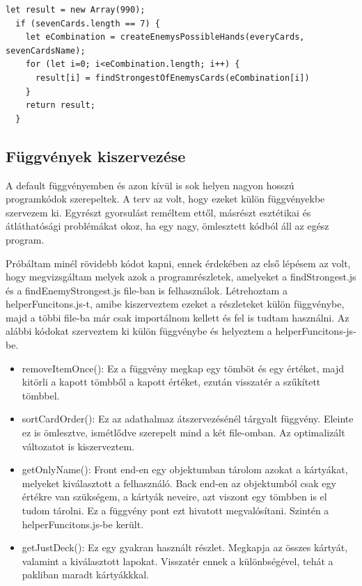 \begin{lstlisting}[style=htmlcssjs]
  let result = new Array(990);
  if (sevenCards.length == 7) {
    let eCombination = createEnemysPossibleHands(everyCards, sevenCardsName);
    for (let i=0; i<eCombination.length; i++) {
      result[i] = findStrongestOfEnemysCards(eCombination[i])
    }
    return result;
  }
\end{lstlisting}

\subsection{Függvények kiszervezése}
A default függvényemben és azon kívül is sok helyen nagyon hosszú programkódok szerepeltek. A terv az volt, hogy ezeket külön függvényekbe szervezem ki. Egyrészt gyorsulást reméltem ettől, másrészt esztétikai és átláthatósági problémákat okoz, ha egy nagy, ömlesztett kódból áll az egész program.

Próbáltam minél rövidebb kódot kapni, ennek érdekében az első lépésem az volt, hogy megvizsgáltam melyek azok a programrészletek, amelyeket a findStrongest.js és a findEnemyStrongest.js file-ban is felhasználok. Létrehoztam a helperFuncitons.js-t, amibe kiszerveztem ezeket a részleteket külön függvénybe, majd a többi file-ba már csak importálnom kellett és fel is tudtam használni. Az alábbi kódokat szerveztem ki külön függvénybe és helyeztem a helperFuncitons-js-be.

\begin{itemize}
    \item removeItemOnce(): Ez a függvény megkap egy tömböt és egy értéket, majd kitörli a kapott tömbből a kapott értéket, ezután visszatér a szűkített tömbbel.
    \item sortCardOrder(): Ez az adathalmaz átszervezésénél tárgyalt függvény. Eleinte ez is ömlesztve, ismétlődve szerepelt mind a két file-omban. Az optimalizált változatot is kiszerveztem.
    \item getOnlyName(): Front end-en egy objektumban tárolom azokat a kártyákat, melyeket kiválasztott a felhasználó. Back end-en az objektumból csak egy értékre van szükségem, a kártyák neveire, azt viszont egy tömbben is el tudom tárolni. Ez a függvény pont ezt hivatott megvalósítani. Szintén a helperFuncitons.js-be került.
    \item getJustDeck(): Ez egy gyakran használt részlet. Megkapja az összes kártyát, valamint a kiválasztott lapokat. Visszatér ennek a különbségével, tehát a pakliban maradt kártyákkkal.
\end{itemize}

